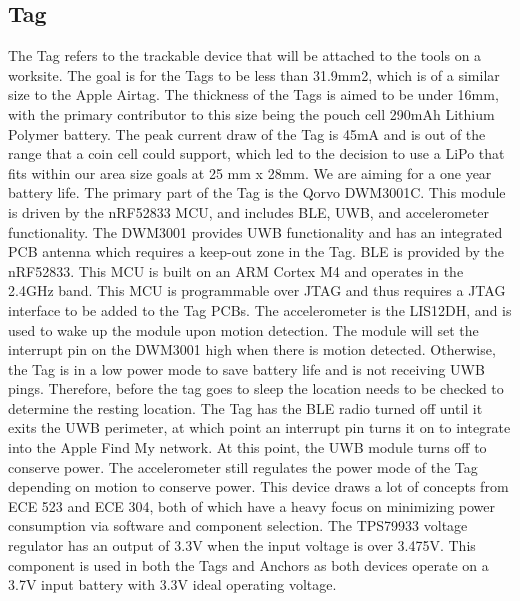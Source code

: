 \documentclass[conference]{IEEEtran}
\begin{document}
\subsection{Tag}\label{AA}
The Tag refers to the trackable device that will be attached to the tools on a worksite. The goal is for the Tags to be less than 31.9mm2, which is of a similar size to the Apple Airtag. The thickness of the Tags is aimed to be under 16mm, with the primary contributor to this size being the pouch cell 290mAh Lithium Polymer battery. The peak current draw of the Tag is 45mA and is out of the range that a coin cell could support, which led to the decision to use a LiPo that fits within our area size goals at 25 mm x 28mm. We are aiming for a one year battery life.
The primary part of the Tag is the Qorvo DWM3001C. This module is driven by the nRF52833 MCU, and includes BLE, UWB, and accelerometer functionality. The DWM3001 provides UWB functionality and has an integrated PCB antenna which requires a keep-out zone in the Tag. BLE is provided by the nRF52833. This MCU is built on an ARM Cortex M4 and operates in the 2.4GHz band. This MCU is programmable over JTAG and thus requires a JTAG interface to be added to the Tag PCBs. The accelerometer is the LIS12DH, and is used to wake up the module upon motion detection. The module will set the interrupt pin on the DWM3001 high when there is motion detected. Otherwise, the Tag is in a low power mode to save battery life and is not receiving UWB pings. Therefore, before the tag goes to sleep the location needs to be checked to determine the resting location. The Tag has the BLE radio turned off until it exits the UWB perimeter, at which point an interrupt pin turns it on to integrate into the Apple Find My network. At this point, the UWB module turns off to conserve power. The accelerometer still regulates the power mode of the Tag depending on motion to conserve power. This device draws a lot of concepts from ECE 523 and ECE 304, both of which have a heavy focus on minimizing power consumption via software and component selection.
The TPS79933 voltage regulator has an output of 3.3V when the input voltage is over 3.475V. This component is used in both the Tags and Anchors as both devices operate on a 3.7V input battery with 3.3V ideal operating voltage. 
\end{document}
